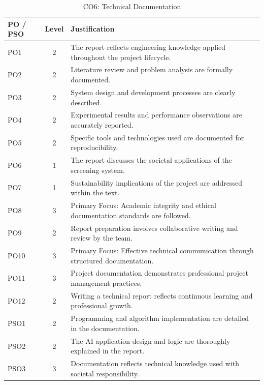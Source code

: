 \documentclass[12pt,a4paper]{report}
\begin{document}
\begin{table}[h!]
    \centering
    \caption{CO6: Technical Documentation}
    \renewcommand{\arraystretch}{1.3}
    \begin{tabularx}{\textwidth}{@{}l c X@{}}
        \toprule
        \textbf{PO / PSO} & \textbf{Level} & \textbf{Justification} \\
        \midrule
        PO1 & 2 & The report reflects engineering knowledge applied throughout the project lifecycle. \\
        PO2 & 2 & Literature review and problem analysis are formally documented. \\
        PO3 & 2 & System design and development processes are clearly described. \\
        PO4 & 2 & Experimental results and performance observations are accurately reported. \\
        PO5 & 2 & Specific tools and technologies used are documented for reproducibility. \\
        PO6 & 1 & The report discusses the societal applications of the screening system. \\
        PO7 & 1 & Sustainability implications of the project are addressed within the text. \\
        PO8 & 3 & Primary Focus: Academic integrity and ethical documentation standards are followed. \\
        PO9 & 2 & Report preparation involves collaborative writing and review by the team. \\
        PO10 & 3 & Primary Focus: Effective technical communication through structured documentation. \\
        PO11 & 3 & Project documentation demonstrates professional project management practices. \\
        PO12 & 2 & Writing a technical report reflects continuous learning and professional growth. \\
        PSO1 & 2 & Programming and algorithm implementation are detailed in the documentation. \\
        PSO2 & 2 & The AI application design and logic are thoroughly explained in the report. \\
        PSO3 & 3 & Documentation reflects technical knowledge used with societal responsibility. \\
        \bottomrule
    \end{tabularx}
\end{table}
\end{document}
